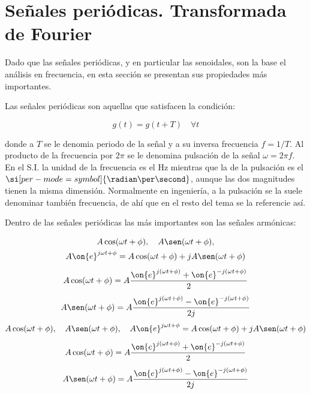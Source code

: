 \section{Señales periódicas. Transformada de Fourier}
\label{sec:frec:Fourier}

Dado que las señales periódicas, y en particular las senoidales, son la base el análisis en
frecuencia, en esta sección se presentan sus propiedades más importantes.

Las señales periódicas son aquellas que satisfacen la condición:

\begin{equation*}
	g(t) = g(t+T) \quad \forall t
\end{equation*}

donde a $T$ se le denomia periodo de la señal y a su inversa frecuencia $f=1/T$. Al
producto de la frecuencia por $2\pi$ se le denomina pulsación de la señal $\omega =2\pi f$. En
el S.I. la unidad de la frecuencia es el $\mathrm{Hz}$ mientras que la de la pulsación es el 
$\si[per-mode=symbol]{\radian\per\second}$, aunque las dos magnitudes tienen la misma dimensión. Normalmente en 
ingeniería, a la pulsación se la suele denominar también frecuencia, de ahí que en el resto del 
tema se la referencie así.


Dentro de las señales periódicas las más importantes son las señales armónicas:

\ifEBOOKPDF
\begin{gather*}
	A\cos(\omega t+\phi), \quad A\sen (\omega t+\phi), \\  A\on{e}^{j\omega t + \phi} = 
		A\cos (\omega t + \phi) + jA\sen (\omega t + \phi) \\[1ex] 
	A\cos (\omega t + \phi) = 
		A\frac{\on{e}^{j(\omega t + \phi) } + \on{e}^{-j(\omega t + \phi)}}{2}\\[1ex]
	A\sen (\omega t + \phi ) = 
		A\frac{\on{e}^{j(\omega t + \phi )}-\on{e}^{-j(\omega t + \phi )}}{2j}
\end{gather*}
\else
\begin{gather*}
	A\cos(\omega t+\phi), \quad A\sen (\omega t+\phi), \quad  A\on{e}^{j\omega t + \phi} = 
		A\cos (\omega t + \phi) + jA\sen (\omega t + \phi) \\[1ex] 
	A\cos (\omega t + \phi) = 
		A\frac{\on{e}^{j(\omega t + \phi) } + \on{e}^{-j(\omega t + \phi)}}{2}\\[1ex]
	A\sen (\omega t + \phi ) = 
		A\frac{\on{e}^{j(\omega t + \phi )}-\on{e}^{-j(\omega t + \phi )}}{2j}
\end{gather*}
\fi

